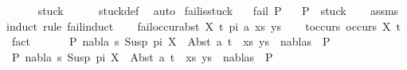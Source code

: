 \begin{isabellebody}
\ \ \isamarkupfalse%
\ {\isachardoublequoteopen}{\isacharparenleft}{\kern0pt}{\isacharbrackleft}{\kern0pt}{\isacharbrackright}{\kern0pt}{\isacharcomma}{\kern0pt}{\isacharbrackleft}{\kern0pt}{\isacharbrackright}{\kern0pt}{\isacharparenright}{\kern0pt}\ {\isasymin}\ stuck{\isachardoublequoteclose}\isanewline
\ \ \ \ \isamarkupfalse%
\ stuck{\isacharunderscore}{\kern0pt}def\ \isamarkupfalse%
\ auto\isanewline
{}\isamarkupfalse%
%
\endisatagproof
{\isafoldproof}%
%
\isadelimproof
\isanewline
%
\endisadelimproof
\isanewline
{}\isamarkupfalse%
\ fail{\isacharunderscore}{\kern0pt}is{\isacharunderscore}{\kern0pt}stuck{\isacharcolon}{\kern0pt}\isanewline
\ \ \ {\isachardoublequoteopen}fail\ P{\isachardoublequoteclose}\isanewline
\ \ \ {\isachardoublequoteopen}P\ {\isasymin}\ stuck{\isachardoublequoteclose}\isanewline
%
\isadelimproof
\ \ %
\endisadelimproof
%
\isatagproof
{}\isamarkupfalse%
\ assms\isanewline
{}\isamarkupfalse%
{\isacharparenleft}{\kern0pt}induct\ rule{\isacharcolon}{\kern0pt}\ fail{\isachardot}{\kern0pt}induct{\isacharparenright}{\kern0pt}\isanewline
\ \ \isamarkupfalse%
\ {\isacharparenleft}{\kern0pt}fail{\isacharunderscore}{\kern0pt}occur{\isacharunderscore}{\kern0pt}abst\ X\ t\ pi\ a\ xs\ ys{\isacharparenright}{\kern0pt}\isanewline
\ \ \isamarkupfalse%
\ t{\isacharunderscore}{\kern0pt}occurs{\isacharcolon}{\kern0pt}\ {\isachardoublequoteopen}occurs\ X\ t{\isachardoublequoteclose}\ \isamarkupfalse%
\ fact\isanewline
\ \ \isamarkupfalse%
\ \isamarkupfalse%
\ {\isachardoublequoteopen}{\isasymnot}\ {\isacharparenleft}{\kern0pt}{\isasymexists}P{}\ nabla\ s{\isachardot}{\kern0pt}\ {\isacharparenleft}{\kern0pt}{\isacharparenleft}{\kern0pt}Susp\ pi\ X\ {\isasymapprox}{\isacharquery}{\kern0pt}\ Abst\ a\ t{\isacharparenright}{\kern0pt}\ {\isacharhash}{\kern0pt}\ xs{\isacharcomma}{\kern0pt}\ ys{\isacharparenright}{\kern0pt}\ {\isasymTurnstile}\ {\isacharparenleft}{\kern0pt}nabla{\isacharcomma}{\kern0pt}s{\isacharparenright}{\kern0pt}\ {\isasymRightarrow}\ P{}{\isacharparenright}{\kern0pt}{\isachardoublequoteclose}\isanewline
\ \ \isamarkupfalse%
\isanewline
\ \ \ \ \isamarkupfalse%
\ {\isachardoublequoteopen}{\isasymexists}P{}\ nabla\ s{\isachardot}{\kern0pt}\ {\isacharparenleft}{\kern0pt}{\isacharparenleft}{\kern0pt}Susp\ pi\ X\ {\isasymapprox}{\isacharquery}{\kern0pt}\ Abst\ a\ t{\isacharparenright}{\kern0pt}\ {\isacharhash}{\kern0pt}\ xs{\isacharcomma}{\kern0pt}\ ys{\isacharparenright}{\kern0pt}\ {\isasymTurnstile}\ {\isacharparenleft}{\kern0pt}nabla{\isacharcomma}{\kern0pt}s{\isacharparenright}{\kern0pt}\ {\isasymRightarrow}\ P{}{\isachardoublequoteclose}\isanewline

\end{isabellebody}
